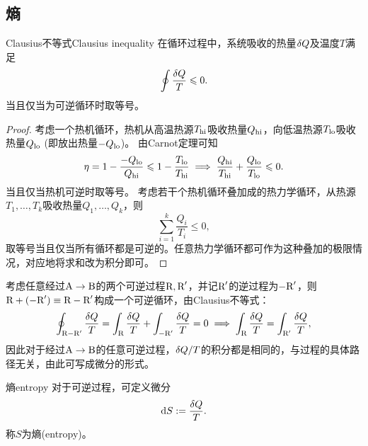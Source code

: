 
\subsection{熵}

\begin{theorem}{Clausius不等式}{Clausius inequality}
	在循环过程中，系统吸收的热量$\mathop{}\!\delta Q$及温度$T$满足
	\begin{equation}
		\oint\frac{\mathop{}\!\delta Q}T\leqslant 0.
	\end{equation}
	当且仅当为可逆循环时取等号。
\end{theorem}

\begin{proof}
	考虑一个热机循环，热机从高温热源$T_{\mathrm{hi}}$吸收热量$Q_{\mathrm{hi}}$，向低温热源$T_{\mathrm{lo}}$吸收热量$Q_{\mathrm{lo}}$ (即放出热量$-Q_{\mathrm{lo}}$)。
	由Carnot定理可知
	\[
		\eta=1-\frac{-Q_{\mathrm{lo}}}{Q_{\mathrm{hi}}}\leqslant1-\frac{T_{\mathrm{lo}}}{T_{\mathrm{hi}}}
		\implies
		\frac{Q_{\mathrm{hi}}}{T_{\mathrm{hi}}}+\frac{Q_{\mathrm{lo}}}{T_{\mathrm{lo}}}\leqslant 0.
	\]
	当且仅当热机可逆时取等号。
	考虑若干个热机循环叠加成的热力学循环，从热源$T_1,\ldots,T_k$吸收热量$Q_1,\ldots,Q_k$，则
	\[
		\sum_{i=1}^k\frac{Q_i}{T_i}\leq 0,
	\]
	取等号当且仅当所有循环都是可逆的。任意热力学循环都可作为这种叠加的极限情况，对应地将求和改为积分即可。
\end{proof}

\begin{corollary}
	考虑任意经过$\text A\to\text B$的两个可逆过程$\text R,\text R'$，并记$\text R'$的逆过程为$-\text R'$，则$\text R+(-\text R')\equiv\text R-\text R'$构成一个可逆循环，由Clausius不等式：
	\[
		\oint_{\text R-\text R'}\frac{\mathop{}\!\delta Q}T=\int_\text R\frac{\mathop{}\!\delta Q}T+\int_{-\text R'}\frac{\mathop{}\!\delta Q}T=0\implies
		\int_\text R\frac{\mathop{}\!\delta Q}T=\int_{\text R'}\frac{\mathop{}\!\delta Q}T,
	\]
	因此对于经过$\text A\to\text B$的任意可逆过程，$\mathop{}\!\delta Q/T$的积分都是相同的，与过程的具体路径无关，由此可写成微分的形式。
\end{corollary}

\begin{definition}
	{熵}{entropy}
	对于可逆过程，可定义微分
	\begin{equation}
		\label{eq:dS=dQ/T}
		\mathop{}\!\mathrm{d} S:=\frac{\mathop{}\!\delta Q}T.
	\end{equation}
	称$S$为熵(entropy)。
\end{definition}

